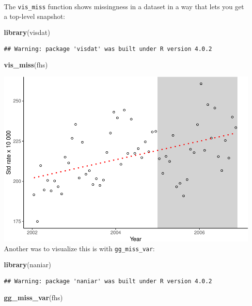 \documentclass[
]{book}
\newenvironment{Shaded}{\begin{snugshade}}{\end{snugshade}}
\newcommand{\KeywordTok}[1]{\textcolor[rgb]{0.13,0.29,0.53}{\textbf{#1}}}
\newcommand{\NormalTok}[1]{#1}
\begin{document}
The \texttt{vis\_miss} function shows missingness in a dataset in a way that lets you
get a top-level snapshot:

\begin{Shaded}
\begin{Highlighting}[]
\KeywordTok{library}\NormalTok{(visdat)}
\end{Highlighting}
\end{Shaded}

\begin{verbatim}
## Warning: package 'visdat' was built under R version 4.0.2
\end{verbatim}

\begin{Shaded}
\begin{Highlighting}[]
\KeywordTok{vis_miss}\NormalTok{(fhs)}
\end{Highlighting}
\end{Shaded}

\includegraphics{adv_epi_analysis_files/figure-latex/unnamed-chunk-65-1.pdf}
Another was to visualize this is with \texttt{gg\_miss\_var}:

\begin{Shaded}
\begin{Highlighting}[]
\KeywordTok{library}\NormalTok{(naniar)}
\end{Highlighting}
\end{Shaded}

\begin{verbatim}
## Warning: package 'naniar' was built under R version 4.0.2
\end{verbatim}

\begin{Shaded}
\begin{Highlighting}[]
\KeywordTok{gg_miss_var}\NormalTok{(fhs)}
\end{Highlighting}
\end{Shaded}
\end{document}
